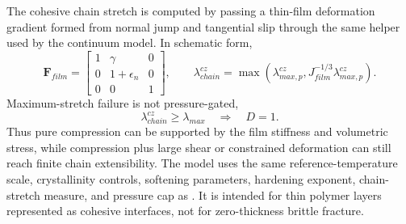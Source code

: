 The cohesive chain stretch is computed by passing a thin-film deformation gradient formed from normal jump and tangential slip through the same helper used by the continuum model.  In schematic form,
\begin{equation}
  \mathbf F_{film}=\begin{bmatrix}
    1 & \gamma & 0\\
    0 & 1+\epsilon_n & 0\\
    0 & 0 & 1
  \end{bmatrix},
  \qquad
  \lambda_{chain}^{cz}=\max\left(\lambda_{max,p}^{cz}, J_{film}^{-1/3}\lambda_{max,p}^{cz}\right).
\end{equation}
Maximum-stretch failure is not pressure-gated,
\begin{equation}
  \lambda_{chain}^{cz}\ge \lambda_{max}\quad\Rightarrow\quad D=1.
  \label{eq:surface-polymer-cz-failure}
\end{equation}
Thus pure compression can be supported by the film stiffness and volumetric stress, while compression plus large shear or constrained deformation can still reach finite chain extensibility.  The model uses the same reference-temperature scale, crystallinity controls, softening parameters, hardening exponent, chain-stretch measure, and pressure cap as .  It is intended for thin polymer layers represented as cohesive interfaces, not for zero-thickness brittle fracture.


